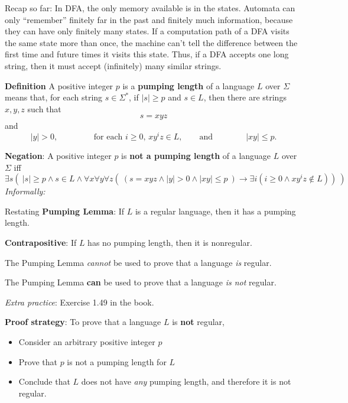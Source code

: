 
Recap so far: In DFA, the only memory available is in the states. Automata can only
``remember'' finitely far in the past and finitely much information, because
they can have only finitely many states. If a computation path of a DFA visits 
the same state more than once, the machine can't tell the difference between 
the first time and future times it visits this state. Thus, if 
a DFA accepts one long string, then it must accept (infinitely) many 
similar strings.

{\bf Definition}  A positive integer $p$ is a {\bf pumping length} of a language $L$ over $\Sigma$ means
that, for each string $s  \in  \Sigma^*$, if  $|s| \geq p$ and $s \in L$, then there are strings $x,y,z$
such that 
\[
s = xyz
\]
and  
\[
|y| > 0,  \qquad \qquad 
\text{ for each $i \geq 0$, $xy^i z \in L$}, \qquad \text{and}
\qquad  \qquad
|xy| \leq p.
\]

{\bf Negation}: A positive integer  $p$  is {\bf not a pumping length} of a language  $L$ over  $\Sigma$  iff
\[
\exists s \left(~  |s| \geq  p \wedge s \in L \wedge \forall x \forall y \forall z  \left( ~\left( s = xyz \wedge 
|y| > 0 \wedge |xy| \leq p~ \right) \to \exists i  (  i \geq 0  \wedge xy^iz  \notin L ) \right) ~\right) 
\]
{\it Informally: }


Restating {\bf Pumping Lemma}: If $L$ is a regular language, then it  has
a pumping length.


{\bf Contrapositive}: If $L$ has no pumping length, then  it is nonregular.

\vfill

{\Large The Pumping Lemma {\it cannot} be used to prove that a language {\it is} regular.} 

{\Large The Pumping Lemma {\bf can} be used to prove that a language {\it is not} regular.}

{\it Extra practice}: Exercise 1.49 in the book.


\vfill

{\bf Proof strategy}: To prove that a language $L$ is {\bf not} regular, 
\begin{itemize}
    \item Consider an arbitrary positive integer $p$
    \item Prove that $p$ is not a pumping length for $L$
    \item Conclude that $L$ does not have {\it any} pumping length, and therefore it is not regular.
\end{itemize}

